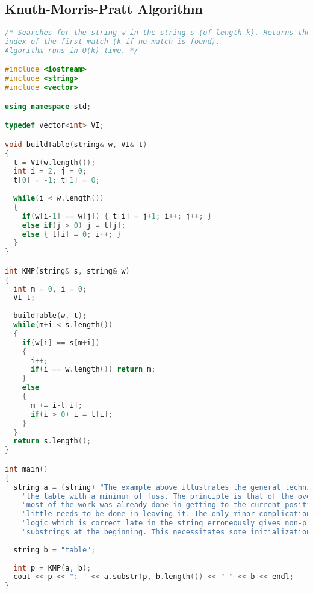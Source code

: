 \subsection{Knuth-Morris-Pratt Algorithm}
\begin{lstlisting}[language=C++]
/* Searches for the string w in the string s (of length k). Returns the 0-based
index of the first match (k if no match is found).
Algorithm runs in O(k) time. */

#include <iostream>
#include <string>
#include <vector>

using namespace std;

typedef vector<int> VI;

void buildTable(string& w, VI& t)
{
  t = VI(w.length());  
  int i = 2, j = 0;
  t[0] = -1; t[1] = 0;
  
  while(i < w.length())
  {
    if(w[i-1] == w[j]) { t[i] = j+1; i++; j++; }
    else if(j > 0) j = t[j];
    else { t[i] = 0; i++; }
  }
}

int KMP(string& s, string& w)
{
  int m = 0, i = 0;
  VI t;
  
  buildTable(w, t);  
  while(m+i < s.length())
  {
    if(w[i] == s[m+i])
    {
      i++;
      if(i == w.length()) return m;
    }
    else
    {
      m += i-t[i];
      if(i > 0) i = t[i];
    }
  }  
  return s.length();
}

int main()
{
  string a = (string) "The example above illustrates the general technique for assembling "+
    "the table with a minimum of fuss. The principle is that of the overall search: "+
    "most of the work was already done in getting to the current position, so very "+
    "little needs to be done in leaving it. The only minor complication is that the "+
    "logic which is correct late in the string erroneously gives non-proper "+
    "substrings at the beginning. This necessitates some initialization code.";
  
  string b = "table";
  
  int p = KMP(a, b);
  cout << p << ": " << a.substr(p, b.length()) << " " << b << endl;
}

\end{lstlisting}